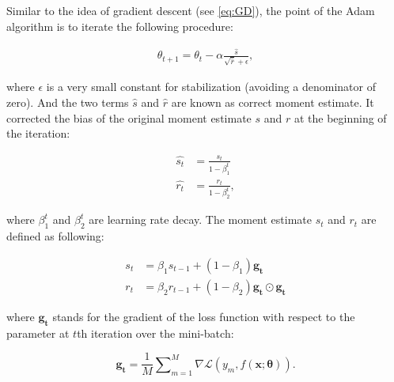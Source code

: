 \documentclass[
	parskip, 			   %
	twoside, 			   %
	DIV=14, 			   %
	BCOR=15.0mm, 		   %
	headsepline, 		   %
	open=right, 		   %
	captions=tableheading, %
	bibliography=totoc,    %
	numbers=noenddot       %
]{scrreprt}
\begin{document}
Similar to the idea of gradient descent (see \ref{eq:GD}), the point of the Adam algorithm is to iterate the following procedure:

\begin{equation}
    \label{eq:Adam_GD}
    \begin{aligned}
        \theta_{t+1} = \theta_{t} - \alpha \frac{\hat{s}}{\sqrt{\hat{r}} + \epsilon},
    \end{aligned}
\end{equation}

where $\epsilon$ is a very small constant for stabilization (avoiding a denominator of zero). And the two terms $\hat{s}$ and $\hat{r}$ are known as correct moment estimate. It corrected the bias of the original moment estimate $s$ and $r$ at the beginning of the iteration:

\begin{equation}
    \label{eq:correct_moment_estimate}
    \begin{aligned}
        \hat{s_t} &= \frac{s_t}{1-\beta_1^t}
        \\
        \hat{r_t} &= \frac{r_t}{1-\beta_2^t},
    \end{aligned}
\end{equation}

where $\beta_1^t$ and $\beta_2^t$ are learning rate decay. The moment estimate $s_t$ and $r_t$ are defined as following:

\begin{equation}
    \label{eq:moment_estimate}
    \begin{aligned}
        s_t &= \beta_1 s_{t-1} + (1-\beta_1) \mathbf{g_t}
        \\
        r_t &= \beta_2 r_{t-1} + (1-\beta_2) \mathbf{g_t} \odot \mathbf{g_t}
    \end{aligned}
\end{equation}

where $\mathbf{g_t}$ stands for the gradient of the loss function with respect to the parameter at $t$th iteration over the mini-batch:

\begin{equation}
    \label{eq:mean_gradient}
    \mathbf{g_t} = \frac{1}{M} \sum\nolimits_{m=1}^M \nabla \mathcal{L}\left( y_{m},f(\mathbf{x};\mathbf{\theta}) \right).
\end{equation}
 
\end{document}
